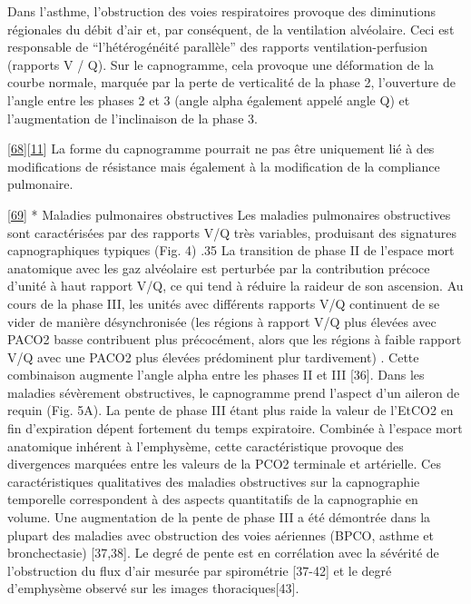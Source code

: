\documentclass[12pt,]{article}
\begin{document}
Dans l'asthme, l'obstruction des voies respiratoires provoque des
diminutions régionales du débit d'air et, par conséquent, de la
ventilation alvéolaire. Ceci est responsable de ``l'hétérogénéité
parallèle'' des rapports ventilation-perfusion (rapports V / Q). Sur le
capnogramme, cela provoque une déformation de la courbe normale, marquée
par la perte de verticalité de la phase 2, l'ouverture de l'angle entre
les phases 2 et 3 (angle alpha également appelé angle Q) et
l'augmentation de l'inclinaison de la phase 3.

{[}\protect\hyperlink{ref-babik2012effects}{68}{]}{[}\protect\hyperlink{ref-abid2015model}{11}{]}
La forme du capnogramme pourrait ne pas être uniquement lié à des
modifications de résistance mais également à la modification de la
compliance pulmonaire.

{[}\protect\hyperlink{ref-nassar2016capnography}{69}{]} * Maladies
pulmonaires obstructives Les maladies pulmonaires obstructives sont
caractérisées par des rapports V/Q très variables, produisant des
signatures capnographiques typiques (Fig. 4) .35 La transition de phase
II de l'espace mort anatomique avec les gaz alvéolaire est perturbée par
la contribution précoce d'unité à haut rapport V/Q, ce qui tend à
réduire la raideur de son ascension. Au cours de la phase III, les
unités avec différents rapports V/Q continuent de se vider de manière
désynchronisée (les régions à rapport V/Q plus élevées avec PACO2 basse
contribuent plus précocément, alors que les régions à faible rapport V/Q
avec une PACO2 plus élevées prédominent plur tardivement) . Cette
combinaison augmente l'angle alpha entre les phases II et III {[}36{]}.
Dans les maladies sévèrement obstructives, le capnogramme prend l'aspect
d'un aileron de requin (Fig. 5A). La pente de phase III étant plus raide
la valeur de l'EtCO2 en fin d'expiration dépent fortement du temps
expiratoire. Combinée à l'espace mort anatomique inhérent à l'emphysème,
cette caractéristique provoque des divergences marquées entre les
valeurs de la PCO2 terminale et artérielle. Ces caractéristiques
qualitatives des maladies obstructives sur la capnographie temporelle
correspondent à des aspects quantitatifs de la capnographie en volume.
Une augmentation de la pente de phase III a été démontrée dans la
plupart des maladies avec obstruction des voies aériennes (BPCO, asthme
et bronchectasie) {[}37,38{]}. Le degré de pente est en corrélation avec
la sévérité de l'obstruction du flux d'air mesurée par spirométrie
{[}37-42{]} et le degré d'emphysème observé sur les images
thoraciques{[}43{]}.
\end{document}
